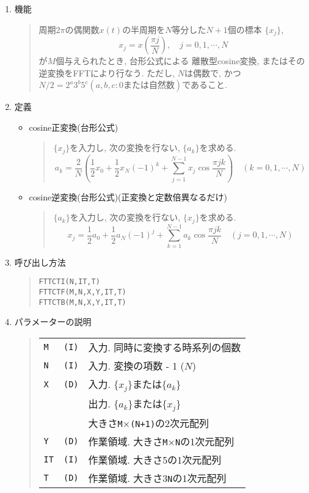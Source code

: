 \documentclass[a4j]{jarticle}
\newcommand{\ttM}{{\tt M}}
\newcommand{\ttN}{{\tt N}}
\begin{document}
\begin{enumerate}

  \item 機能 
  \begin{quote}
    周期$2\pi$の偶関数$x(t)$の半周期を$N$等分した$N+1$個の標本
    $\{x_j\}$,
     $$x_j=x(\frac{\pi j}{N}), \quad j=0,1,\cdots,N $$
    が$M$個与えられたとき, 台形公式による
    離散型cosine変換, またはその逆変換をFFTにより行なう. ただし, 
    $N$は偶数で, かつ$N/2=2^a3^b5^c(a,b,c: 0または自然数)$であること.
  \end{quote}

  \item 定義
    \begin{itemize}
     \item cosine正変換(台形公式)
      \begin{quote}
       $\{x_j\}$を入力し, 次の変換を行ない, $\{a_k\}$を求める.
       $$a_k= \frac2N\left(\frac12 x_0+\frac12 x_N(-1)^k
              +\sum^{N-1}_{j=1}x_j\cos\frac{\pi jk}N\right)
       \quad (k=0,1,\cdots,N)$$
      \end{quote}

     \item cosine逆変換(台形公式)(正変換と定数倍異なるだけ)
      \begin{quote}
       $\{a_k\}$を入力し, 次の変換を行ない, $\{x_j\}$を求める.
       $$x_j=\frac12 a_0+\frac12 a_N(-1)^j
              +\sum^{N-1}_{k=1}a_k\cos\frac{\pi jk}N
       \quad (j=0,1,\cdots,N)$$
      \end{quote}
     \end{itemize}    

  \item 呼び出し方法 
  \begin{quote}
    {\tt FTTCTI(N,IT,T)}\\
    {\tt FTTCTF(M,N,X,Y,IT,T)}\\
    {\tt FTTCTB(M,N,X,Y,IT,T)}
  \end{quote}
  \item パラメーターの説明 
  \begin{quote}
    \begin{tabular}{llp{10cm}}
      {\tt M }&{\tt (I)}& 入力. 同時に変換する時系列の個数\\
      {\tt N }&{\tt (I)}& 入力. 変換の項数 - 1 ($N$)\\
      {\tt X }   & {\tt (D)} & 入力. $\{x_j\}$または$\{a_k\}$\\
                 &           & 出力. $\{a_k\}$または$\{x_j\}$\\
                 &           & 大きさ\ttM$\times${\tt (N+1)}の2次元配列\\
      {\tt Y }   & {\tt (D)} & 作業領域. 大きさ\ttM$\times$\ttN の1次元配列\\
      {\tt IT}   & {\tt (I)} & 作業領域. 大きさ5の1次元配列\\
      {\tt T }   & {\tt (D)} & 作業領域. 大きさ3\ttN の1次元配列
    \end{tabular}
  \end{quote}


\end{enumerate}
\end{document}
